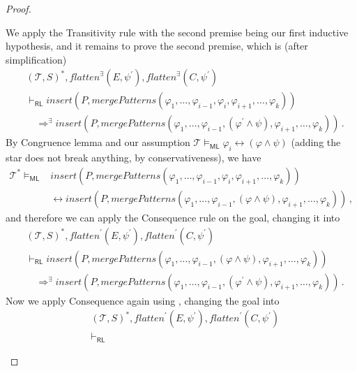 \documentclass{article}
\newcommand{\RL}{\mathsf{RL}}
\newcommand{\ML}{\mathsf{ML}}
\begin{document}
\begin{proof}
\begin{enumerate}
    We apply the Transitivity rule with the second premise being our first inductive hypothesis, and it remains to prove the second premise, which is (after simplification)
    \begin{align*}
        & (\mathcal{T}, S)^*, \mathit{flatten}^\exists(E, \psi^\prime), \mathit{flatten}^\exists(C, \psi^\prime)
        \\& \vdash_\RL
        \mathit{insert}(P, \mathit{mergePatterns}(\varphi_1, \ldots, \varphi_{i-1}, \varphi_i, \varphi_{i+1}, \ldots,                          \varphi_k))
        \\&\quad \Rightarrow^\exists
        \mathit{insert}(P, \mathit{mergePatterns}(\varphi_1, \ldots, \varphi_{i-1}, (\varphi^\prime \land \psi), \varphi_{i+1}, \ldots, \varphi_k) ) \, .
    \end{align*}
    By Congruence lemma and our assumption $\mathcal{T} \vDash_\ML \varphi_i \leftrightarrow (\varphi \land \psi)$ (adding the star does not break anything, by conservativeness), we have
    \begin{align*}
        \mathcal{T}^* \vDash_\ML &
        \mathit{insert}(P, \mathit{mergePatterns}(\varphi_1, \ldots, \varphi_{i-1}, \varphi_i, \varphi_{i+1}, \ldots,                          \varphi_k))
        \\ & \leftrightarrow
        \mathit{insert}(P, \mathit{mergePatterns}(\varphi_1, \ldots, \varphi_{i-1}, (\varphi \land \psi), \varphi_{i+1}, \ldots, \varphi_k)) \, ,
    \end{align*}
    and therefore we can apply the Consequence rule on the goal, changing it into
    \begin{align*}
        & (\mathcal{T}, S)^*, \mathit{flatten}^\prime(E, \psi^\prime), \mathit{flatten}^\prime(C, \psi^\prime)
        \\& \vdash_\RL
        \mathit{insert}(P, \mathit{mergePatterns}(\varphi_1, \ldots, \varphi_{i-1}, (\varphi \land \psi), \varphi_{i+1}, \ldots,                          \varphi_k))
        \\&\quad \Rightarrow^\exists
        \mathit{insert}(P, \mathit{mergePatterns}(\varphi_1, \ldots, \varphi_{i-1}, (\varphi^\prime \land \psi), \varphi_{i+1}, \ldots, \varphi_k)) \, .
    \end{align*}
    Now we apply Consequence again using , changing the goal into
    \begin{align*}
        & (\mathcal{T}, S)^*, \mathit{flatten}^\prime(E, \psi^\prime), \mathit{flatten}^\prime(C, \psi^\prime)
        \\& \vdash_\RL

\end{align*}
\end{enumerate}
\end{proof}
\end{document}
